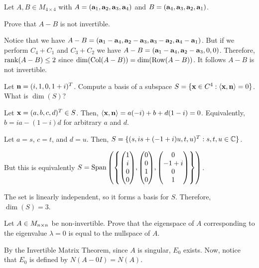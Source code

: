 \documentclass{agony}
\begin{document}
\begin{prob}
  Let $A,B \in M_{4\times 4}$ with $A = (\vb a_1,\vb a_2,\vb a_3,\vb a_4)$
  and $B = (\vb a_4,\vb a_3,\vb a_2,\vb a_1)$.

  Prove that $A-B$ is not invertible.
\end{prob}
\begin{prf}
  Notice that we have
  $A-B = (\vb a_1 - \vb a_4, \vb a_2 - \vb a_3, \vb a_3 - \vb a_2, \vb a_4 - \vb a_1)$.
  But if we perform $C_4 + C_1$ and $C_3 + C_2$ we have
  $A-B = (\vb a_1 - \vb a_4, \vb a_2 - \vb a_3, 0, 0)$.
  Therefore, $\rank(A-B) \leq 2$ since $\dim(\operatorname{Col}(A-B)) = \dim(\operatorname{Row}(A-B))$.
  It follows $A-B$ is not invertible.
\end{prf}

\begin{prob}
  Let $\vb n = (i, 1, 0, 1+i)^T$.
  Compute a basis of a subspace $S = \{\vb x \in C^4 : \ev{\vb x,\vb n} = 0\}$.
  What is $\dim(S)$?
\end{prob}
\begin{sol}
  Let $\vb x = (a,b,c,d)^T \in S$.
  Then, $\ev{\vb x,\vb n} = a(-i) + b + d(1-i) = 0$.
  Equivalently, $b = ia - (1-i)d$ for arbitrary $a$ and $d$.

  Let $a = s$, $c = t$, and $d = u$.
  Then, $S = \{ (s,is+(-1+i)u,t,u)^T : s,t,u\in\mathbb{C} \}$.

  But this is equivalently $S = \Span\qty(\qty{\mqty(1\\i\\0\\0), \mqty(0\\0\\1\\0), \mqty(0\\-1+i\\0\\1)})$.

  The set is linearly independent, so it forms a basis for $S$.
  Therefore, $\dim(S) = 3$.
\end{sol}

\begin{prob}
  Let $A \in M_{n \times n}$ be non-invertible.
  Prove that the eigenspace of $A$ corresponding to the eigenvalue $\lambda = 0$
  is equal to the nullspace of $A$.
\end{prob}
\begin{prf}
  By the Invertible Matrix Theorem, since $A$ is singular, $E_0$ exists.
  Now, notice that $E_0$ is defined by $N(A - 0I) = N(A)$.
\end{prf}
\end{document}
